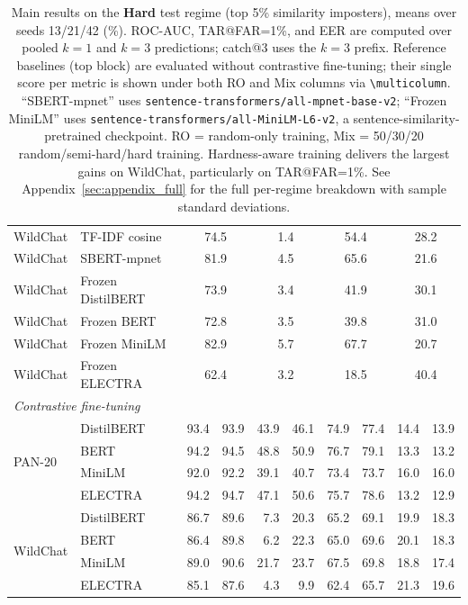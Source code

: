 \documentclass[11pt]{article}
\begin{document}
\begin{table}[!t]
\begin{tabular}{l l rr rr rr rr}
WildChat & TF-IDF cosine     & \multicolumn{2}{c}{74.5} & \multicolumn{2}{c}{\phantom{0}1.4} & \multicolumn{2}{c}{54.4} & \multicolumn{2}{c}{28.2} \\
WildChat & SBERT-mpnet       & \multicolumn{2}{c}{81.9} & \multicolumn{2}{c}{\phantom{0}4.5} & \multicolumn{2}{c}{65.6} & \multicolumn{2}{c}{21.6} \\
WildChat & Frozen DistilBERT & \multicolumn{2}{c}{73.9} & \multicolumn{2}{c}{\phantom{0}3.4} & \multicolumn{2}{c}{41.9} & \multicolumn{2}{c}{30.1} \\
WildChat & Frozen BERT       & \multicolumn{2}{c}{72.8} & \multicolumn{2}{c}{\phantom{0}3.5} & \multicolumn{2}{c}{39.8} & \multicolumn{2}{c}{31.0} \\
WildChat & Frozen MiniLM     & \multicolumn{2}{c}{82.9} & \multicolumn{2}{c}{\phantom{0}5.7} & \multicolumn{2}{c}{67.7} & \multicolumn{2}{c}{20.7} \\
WildChat & Frozen ELECTRA    & \multicolumn{2}{c}{62.4} & \multicolumn{2}{c}{\phantom{0}3.2} & \multicolumn{2}{c}{18.5} & \multicolumn{2}{c}{40.4} \\
\midrule
\multicolumn{10}{l}{\textit{Contrastive fine-tuning}} \\
\multirow{4}{*}{PAN-20}
 & DistilBERT & 93.4 & 93.9 & 43.9 & 46.1 & 74.9 & 77.4 & 14.4 & 13.9 \\
 & BERT       & 94.2 & 94.5 & 48.8 & 50.9 & 76.7 & 79.1 & 13.3 & 13.2 \\
 & MiniLM     & 92.0 & 92.2 & 39.1 & 40.7 & 73.4 & 73.7 & 16.0 & 16.0 \\
 & ELECTRA    & 94.2 & 94.7 & 47.1 & 50.6 & 75.7 & 78.6 & 13.2 & 12.9 \\
\midrule
\multirow{4}{*}{WildChat}
 & DistilBERT & 86.7 & 89.6 & \phantom{0}7.3 & 20.3 & 65.2 & 69.1 & 19.9 & 18.3 \\
 & BERT       & 86.4 & 89.8 & \phantom{0}6.2 & 22.3 & 65.0 & 69.6 & 20.1 & 18.3 \\
 & MiniLM     & 89.0 & 90.6 & 21.7 & 23.7 & 67.5 & 69.8 & 18.8 & 17.4 \\
 & ELECTRA    & 85.1 & 87.6 & \phantom{0}4.3 & \phantom{0}9.9 & 62.4 & 65.7 & 21.3 & 19.6 \\
\bottomrule
\end{tabular}
\caption{Main results on the \textbf{Hard} test regime (top 5\% similarity imposters), means over seeds 13/21/42 (\%). ROC-AUC, TAR@FAR=1\%, and EER are computed over pooled $k{=}1$ and $k{=}3$ predictions; catch@3 uses the $k{=}3$ prefix. Reference baselines (top block) are evaluated without contrastive fine-tuning; their single score per metric is shown under both RO and Mix columns via \texttt{\textbackslash multicolumn}. ``SBERT-mpnet'' uses \texttt{sentence-transformers/all-mpnet-base-v2}; ``Frozen MiniLM'' uses \texttt{sentence-transformers/all-MiniLM-L6-v2}, a sentence-similarity-pretrained checkpoint. RO = random-only training, Mix = 50/30/20 random/semi-hard/hard training. Hardness-aware training delivers the largest gains on WildChat, particularly on TAR@FAR=1\%. See Appendix~\ref{sec:appendix_full} for the full per-regime breakdown with sample standard deviations.}
\label{tab:main_hard}
\end{table}
\end{document}
